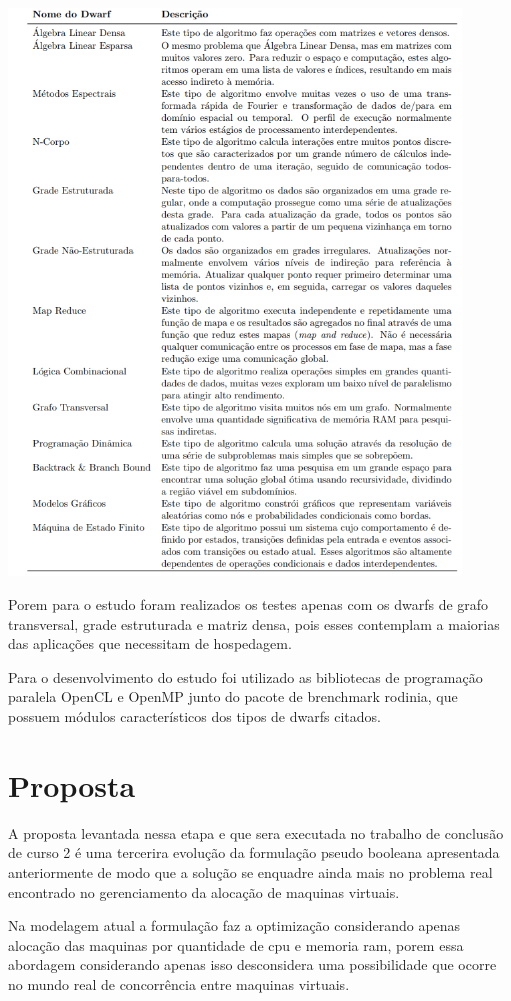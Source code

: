 \includegraphics[width=0.9\textwidth]{tabela_dwarf.png}

Porem para o estudo foram realizados os testes apenas com os dwarfs de grafo transversal, grade estruturada e matriz densa, pois esses contemplam a maiorias das aplicações que necessitam de hospedagem.

Para o desenvolvimento do estudo foi utilizado as bibliotecas de programação paralela OpenCL e OpenMP junto do pacote de brenchmark rodinia, que possuem módulos característicos dos tipos de dwarfs citados.


\chapter[Proposta]{Proposta}

A proposta levantada nessa etapa e que sera executada no trabalho de conclusão de curso 2 é uma tercerira evolução da formulação pseudo booleana apresentada anteriormente de modo que a solução se enquadre ainda mais no problema real encontrado no gerenciamento da alocação de maquinas virtuais.

Na modelagem atual a formulação faz a optimização considerando apenas alocação das maquinas por quantidade de cpu e memoria ram, porem essa abordagem considerando apenas isso desconsidera uma possibilidade que ocorre no mundo real de concorrência entre maquinas virtuais.

